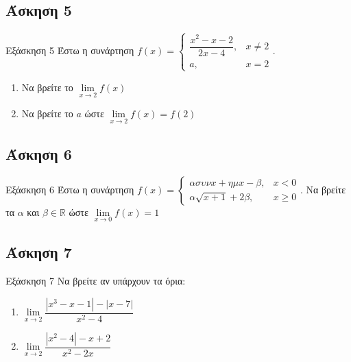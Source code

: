 \documentclass[greek]{beamer}
\begin{document}
\subsection{Άσκηση 5}
\begin{frame}[label=Άσκηση5,t]{Εξάσκηση 5}
  Έστω η συνάρτηση $f(x)=\begin{cases}
      \dfrac{x^2-x-2}{2x-4}, & x\ne 2 \\
      a,                     & x=2
    \end{cases}$.
  \begin{enumerate}
    \item Να βρείτε το $\lim\limits_{x \to 2}{ f(x) }$ \pause
    \item Να βρείτε το $a$ ώστε $\lim\limits_{x \to 2}{ f(x) }=f(2)$
  \end{enumerate}
\end{frame}

\subsection{Άσκηση 6}
\begin{frame}[label=Άσκηση6,t]{Εξάσκηση 6}
  Έστω η συνάρτηση $f(x)=\begin{cases}
      ασυνx+ημx-β,    & x<0    \\
      α\sqrt{x+1}+2β, & x\ge 0
    \end{cases}$.
  Να βρείτε τα $α$ και $β\in\mathbb{R}$ ώστε $\lim\limits_{x \to 0}{ f(x) }=1$

\end{frame}

\subsection{Άσκηση 7}
\begin{frame}[label=Άσκηση7,t]{Εξάσκηση 7}
  Να βρείτε αν υπάρχουν τα όρια:
  \begin{enumerate}
    \item $\lim\limits_{x \to 2}{ \dfrac{|x^3-x-1|-|x-7|}{x^2-4} }$ \pause
    \item $\lim\limits_{x \to 2}{ \dfrac{|x^2-4|-x+2}{x^2-2x} }$
  \end{enumerate}

\end{frame}
\end{document}
